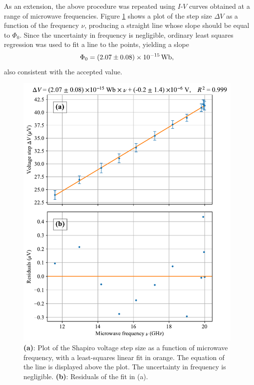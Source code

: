 \documentclass[twocol]{ametsocV6.1}
\begin{document}
As an extension, the above procedure was repeated using $I$-$V$ curves
obtained at a range of microwave frequencies. Figure \ref{fig:step_vs_freq}
shows a plot of the step size $\Delta V$ as a function of the frequency $\nu$,
producing a straight line whose slope should be equal to $\Phi_0$. Since
the uncertainty in frequency is negligible, ordinary least squares regression
was used to fit a line to the points, yielding a slope
\begin{equation}
	\Phi_0 = \SI{2.07 \pm 0.08 e-15}{\weber},
\end{equation}
also consistent with the accepted value.

\begin{figure}[ht]
	\centering
	\includegraphics[width=\linewidth]{../figures/step_vs_freq.pdf}
	\caption{
		\textbf{(a)}: Plot of the Shapiro voltage step size as a function of
		microwave frequency, with a least-squares linear fit in orange.
		The equation of the line is displayed above the plot.
		The uncertainty in frequency is negligible.
		\textbf{(b)}: Residuals of the fit in (a).
	}
	\label{fig:step_vs_freq}
\end{figure}
\end{document}
